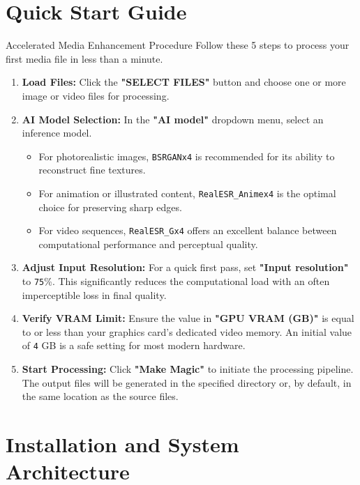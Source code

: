 \documentclass[11pt, a4paper]{article}
\newcommand{\SectionColor}{WarlockGray} %
\newcommand{\setsectioncolor}[1]{\renewcommand{\SectionColor}{#1}}
\newcommand{\inlinecode}[1]{\colorbox{WarlockLightGray}{\small\texttt{#1}}}
\begin{document}
\section{Quick Start Guide}
\begin{quickstartbox}{Accelerated Media Enhancement Procedure}
Follow these 5 steps to process your first media file in less than a minute.
\begin{enumerate}
    \item \textbf{Load Files:} Click the \textbf{"SELECT FILES"} button and choose one or more image or video files for processing.
    \item \textbf{AI Model Selection:} In the \textbf{"AI model"} dropdown menu, select an inference model.
    \begin{itemize}
        \item For photorealistic images, \inlinecode{BSRGANx4} is recommended for its ability to reconstruct fine textures.
        \item For animation or illustrated content, \inlinecode{RealESR_Animex4} is the optimal choice for preserving sharp edges.
        \item For video sequences, \inlinecode{RealESR_Gx4} offers an excellent balance between computational performance and perceptual quality.
    \end{itemize}
    \item \textbf{Adjust Input Resolution:} For a quick first pass, set \textbf{"Input resolution"} to \texttt{75}\%. This significantly reduces the computational load with an often imperceptible loss in final quality.
    \item \textbf{Verify VRAM Limit:} Ensure the value in \textbf{"GPU VRAM (GB)"} is equal to or less than your graphics card's dedicated video memory. An initial value of \texttt{4} GB is a safe setting for most modern hardware.
    \item \textbf{Start Processing:} Click \textbf{"Make Magic"} to initiate the processing pipeline. The output files will be generated in the specified directory or, by default, in the same location as the source files.
\end{enumerate}
\end{quickstartbox}

\setsectioncolor{InstallColor}
\section{Installation and System Architecture}
\end{document}

